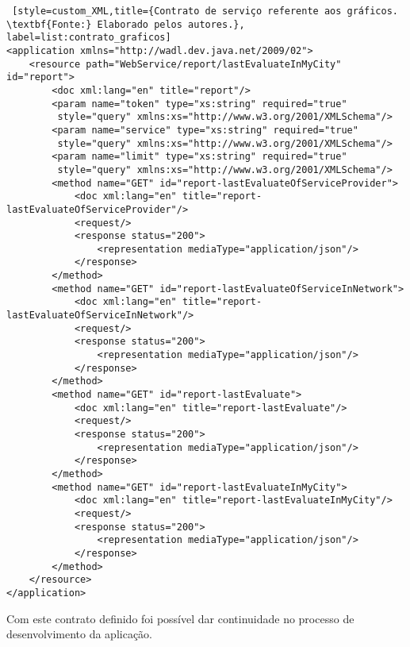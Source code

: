 \begin{lstlisting} [style=custom_XML,title={Contrato de serviço referente aos gráficos. \textbf{Fonte:} Elaborado pelos autores.}, label=list:contrato_graficos] 	
<application xmlns="http://wadl.dev.java.net/2009/02">
	<resource path="WebService/report/lastEvaluateInMyCity" id="report">
		<doc xml:lang="en" title="report"/>
		<param name="token" type="xs:string" required="true"
		 style="query" xmlns:xs="http://www.w3.org/2001/XMLSchema"/>
		<param name="service" type="xs:string" required="true"
		 style="query" xmlns:xs="http://www.w3.org/2001/XMLSchema"/>
		<param name="limit" type="xs:string" required="true"
		 style="query" xmlns:xs="http://www.w3.org/2001/XMLSchema"/>
		<method name="GET" id="report-lastEvaluateOfServiceProvider">
			<doc xml:lang="en" title="report-lastEvaluateOfServiceProvider"/>
			<request/>
			<response status="200">
				<representation mediaType="application/json"/>
			</response>
		</method>
		<method name="GET" id="report-lastEvaluateOfServiceInNetwork">
			<doc xml:lang="en" title="report-lastEvaluateOfServiceInNetwork"/>
			<request/>
			<response status="200">
				<representation mediaType="application/json"/>
			</response>
		</method>
		<method name="GET" id="report-lastEvaluate">
			<doc xml:lang="en" title="report-lastEvaluate"/>
			<request/>
			<response status="200">
				<representation mediaType="application/json"/>
			</response>
		</method>
		<method name="GET" id="report-lastEvaluateInMyCity">
			<doc xml:lang="en" title="report-lastEvaluateInMyCity"/>
			<request/>
			<response status="200">
				<representation mediaType="application/json"/>
			</response>
		</method>
	</resource>
</application>
\end{lstlisting}

Com este contrato definido foi possível dar continuidade no processo de desenvolvimento da aplicação.
